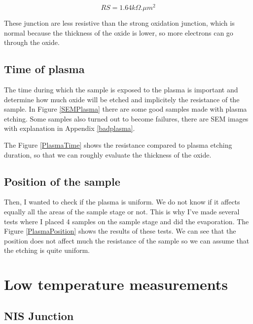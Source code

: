                 \[RS=1.64k\Omega.\mu m^2\]
                
                These junction are less resistive than the strong oxidation junction, which is normal because the thickness of the oxide is lower, so more electrons can go through the oxide.
                
                \subsection{Time of plasma}
                
                The time during which the sample is exposed to the plasma is important and determine how much oxide will be etched and implicitely the resistance of the sample.
                 In Figure \ref{SEMPlasma} there are some good samples made with plasma etching. Some samples also turned out to become failures, there are SEM images with explanation in Appendix \ref{badplasma}.
                 
                 
                 The Figure \ref{PlasmaTime} shows the resistance compared to plasma etching duration, so that we can roughly evaluate the thickness of the oxide.
                
                
                \subsection{Position of the sample}
                
                Then, I wanted to check if the plasma is uniform. We do not know if it affects equally all the areas of the sample stage or not. This is why I've made several tests where I placed 4 samples on the sample stage and did the evaporation. The Figure \ref{PlasmaPosition} shows the results of these tests. We can see that the position does not affect much the resistance of the sample so we can assume that the etching is quite uniform.
                
                
                \section{Low temperature measurements}
                
                \subsection{NIS Junction}
                
